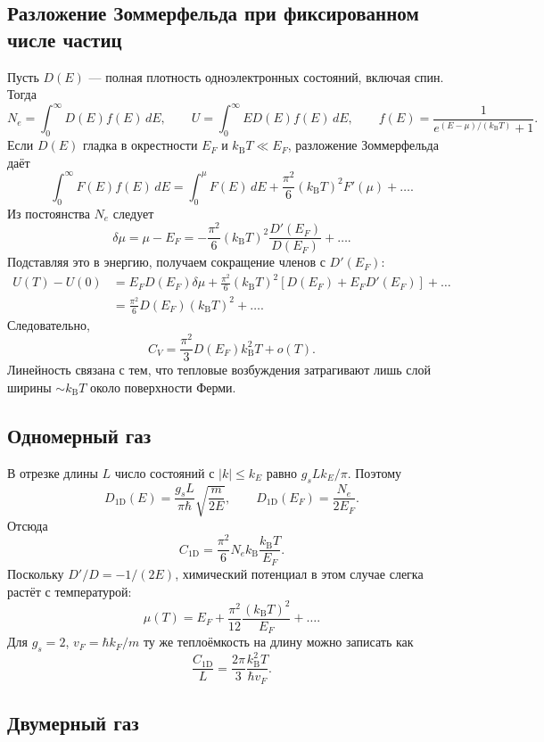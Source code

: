 \documentclass[../final.tex]{subfiles}
\begin{document}
\solution

\subsection*{Разложение Зоммерфельда при фиксированном числе частиц}

Пусть $D(E)$ --- полная плотность одноэлектронных состояний,
включая спин. Тогда
\[
    N_e=\int_0^\infty D(E)f(E)\,dE,\qquad
    U=\int_0^\infty ED(E)f(E)\,dE,
    \qquad f(E)=\frac1{e^{(E-\mu)/(k_{\mathrm B}T)}+1}.
\]
Если $D(E)$ гладка в окрестности $E_F$ и
$k_{\mathrm B}T\ll E_F$, разложение Зоммерфельда даёт
\[
    \int_0^\infty F(E)f(E)\,dE
       =\int_0^\mu F(E)\,dE
          +\frac{\pi^2}{6}(k_{\mathrm B}T)^2F'(\mu)+\ldots.
\]
Из постоянства $N_e$ следует
\[
    \delta\mu=\mu-E_F
       =-\frac{\pi^2}{6}(k_{\mathrm B}T)^2
          \frac{D'(E_F)}{D(E_F)}+\ldots.
\]
Подставляя это в энергию, получаем сокращение членов с $D'(E_F)$:
\begin{align*}
    U(T)-U(0)
       &=E_FD(E_F)\delta\mu
          +\frac{\pi^2}{6}(k_{\mathrm B}T)^2
             [D(E_F)+E_FD'(E_F)]+\ldots\\
       &=\frac{\pi^2}{6}D(E_F)(k_{\mathrm B}T)^2+\ldots.
\end{align*}
Следовательно,
\[
    C_V=\frac{\pi^2}{3}D(E_F)k_{\mathrm B}^2T+o(T).
\]
Линейность связана с тем, что тепловые возбуждения затрагивают
лишь слой ширины $\sim k_{\mathrm B}T$ около поверхности Ферми.

\subsection*{Одномерный газ}

В отрезке длины $L$ число состояний с $|k|\le k_E$
равно $g_sLk_E/\pi$. Поэтому
\[
    D_{1\mathrm D}(E)=\frac{g_sL}{\pi\hbar}
       \sqrt{\frac m{2E}},\qquad
    D_{1\mathrm D}(E_F)=\frac{N_e}{2E_F}.
\]
Отсюда
\[
    C_{1\mathrm D}=\frac{\pi^2}{6}N_e k_{\mathrm B}
       \frac{k_{\mathrm B}T}{E_F}.
\]
Поскольку $D'/D=-1/(2E)$, химический потенциал в этом случае
слегка растёт с температурой:
\[
    \mu(T)=E_F+\frac{\pi^2}{12}
       \frac{(k_{\mathrm B}T)^2}{E_F}+\ldots.
\]
Для $g_s=2$, $v_F=\hbar k_F/m$ ту же теплоёмкость на длину
можно записать как
\[
    \frac{C_{1\mathrm D}}L=\frac{2\pi}{3}
       \frac{k_{\mathrm B}^2T}{\hbar v_F}.
\]

\subsection*{Двумерный газ}
\end{document}
